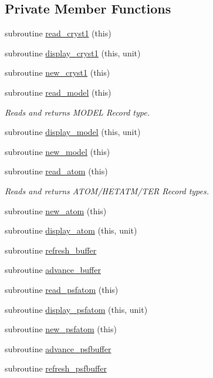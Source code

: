 \subsection*{Private Member Functions}
\begin{DoxyCompactItemize}
\item 
subroutine \hyperlink{classmolreader_af85c1b386f0dc78ebf55e003b4f8c83a}{read\-\_\-cryst1} (this)
\item 
subroutine \hyperlink{classmolreader_ac9a2b0ff287faa780311cc432b866610}{display\-\_\-cryst1} (this, unit)
\item 
subroutine \hyperlink{classmolreader_ac284dc33f40874d6156c1cd36781002c}{new\-\_\-cryst1} (this)
\item 
subroutine \hyperlink{classmolreader_a64ff990dc05c01debc1138dd012f4bcb}{read\-\_\-model} (this)
\begin{DoxyCompactList}\small\item\em Reads and returns M\-O\-D\-E\-L Record type. \end{DoxyCompactList}\item 
subroutine \hyperlink{classmolreader_a462d061944b74f7145b8bf89fc3439fc}{display\-\_\-model} (this, unit)
\item 
subroutine \hyperlink{classmolreader_a8edb660b2e1b64a5d78593c734afbe95}{new\-\_\-model} (this)
\item 
subroutine \hyperlink{classmolreader_a49ccaf345b633e27f69ad7a5a8637a2a}{read\-\_\-atom} (this)
\begin{DoxyCompactList}\small\item\em Reads and returns A\-T\-O\-M/\-H\-E\-T\-A\-T\-M/\-T\-E\-R Record types. \end{DoxyCompactList}\item 
subroutine \hyperlink{classmolreader_ae1000e1ea4e46f858a3640c08563c3ff}{new\-\_\-atom} (this)
\item 
subroutine \hyperlink{classmolreader_adb757da4ec2256578422254dad5b262e}{display\-\_\-atom} (this, unit)
\item 
subroutine \hyperlink{classmolreader_a16d4776fded57cf8aa38f639610cad84}{refresh\-\_\-buffer}
\item 
subroutine \hyperlink{classmolreader_ac7b950f165e89b12ccc8fff1c0f3bae9}{advance\-\_\-buffer}
\item 
subroutine \hyperlink{classmolreader_a81fcc5a3f49380ccd10b02b229f5067d}{read\-\_\-psfatom} (this)
\item 
subroutine \hyperlink{classmolreader_a737dbe023a6cbecab8269981ffdfa31c}{display\-\_\-psfatom} (this, unit)
\item 
subroutine \hyperlink{classmolreader_a56968311293e3c68022fe3bbe3600306}{new\-\_\-psfatom} (this)
\item 
subroutine \hyperlink{classmolreader_abf243c87d2f9429f3ed94293d438c7c7}{advance\-\_\-psfbuffer}
\item 
subroutine \hyperlink{classmolreader_a13131c46b34d0385ba7eadd0b1b88df9}{refresh\-\_\-psfbuffer}
\end{DoxyCompactItemize}
